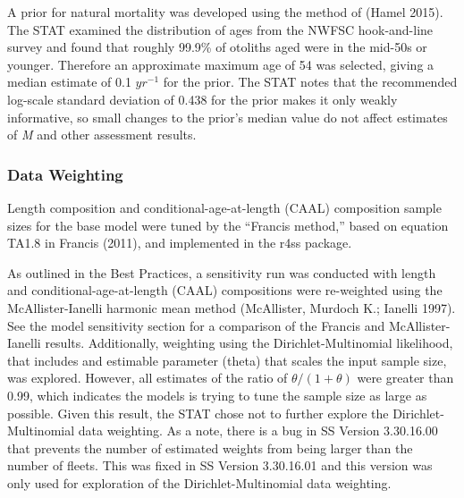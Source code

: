 \documentclass[11pt,
  english,
  a4paper,
]{article}
\begin{document}
A prior for natural mortality was developed using the method of {(Hamel 2015)\leavevmode\tagmcend\tagstructend}. The STAT examined the distribution of ages from the NWFSC hook-and-line survey and found that roughly 99.9\% of otoliths aged were in the mid-50s or younger. Therefore an approximate maximum age of 54 was selected, giving a median estimate of 0.1 {\(yr^{-1}\)\leavevmode\tagmcend\tagstructend} for the prior. The STAT notes that the recommended log-scale standard deviation of 0.438 for the prior makes it only weakly informative, so small changes to the prior's median value do not affect estimates of \emph{M} and other assessment results.


\hypertarget{data-weighting}{%
\subsubsection{Data Weighting}\label{data-weighting}}

\leavevmode\tagmcend\tagstructend

Length composition and conditional-age-at-length (CAAL) composition sample sizes for the base model were tuned by the ``Francis method,'' based on equation TA1.8 in Francis {(2011)\leavevmode\tagmcend\tagstructend}, and implemented in the r4ss package.

As outlined in the Best Practices, a sensitivity run was conducted with length and conditional-age-at-length (CAAL) compositions were re-weighted using the McAllister-Ianelli harmonic mean method {(McAllister, Murdoch K.; Ianelli 1997)\leavevmode\tagmcend\tagstructend}. See the model sensitivity section for a comparison of the Francis and McAllister-Ianelli results. Additionally, weighting using the Dirichlet-Multinomial likelihood, that includes and estimable parameter (theta) that scales the input sample size, was explored. However, all estimates of the ratio of {\(\theta/(1+\theta)\)\leavevmode\tagmcend\tagstructend} were greater than 0.99, which indicates the models is trying to tune the sample size as large as possible. Given this result, the STAT chose not to further explore the Dirichlet-Multinomial data weighting. As a note, there is a bug in SS Version 3.30.16.00 that prevents the number of estimated weights from being larger than the number of fleets. This was fixed in SS Version 3.30.16.01 and this version was only used for exploration of the Dirichlet-Multinomial data weighting.
\end{document}
